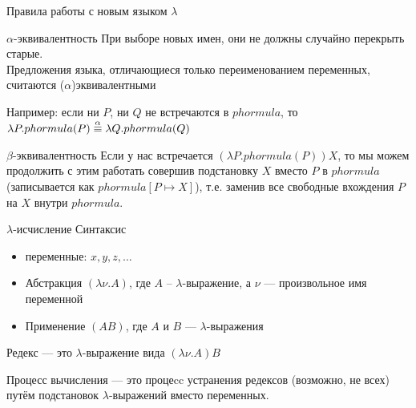 \begin{frame}{Правила работы с новым языком $\lambda$}
\begin{block}{$\alpha$-эквивалентность}
При выборе новых имен, они не должны случайно перекрыть старые.\\
Предложения языка, отличающиеся только переименованием переменных, считаются ($\alpha$)эквивалентными
\end{block}
Например:  если ни $P$, ни $Q$ не встречаются в $phormula$, то $\lambda P. phormula(P)  \overset{\alpha}{\equiv}{} \lambda Q. phormula(Q) $

\begin{block}{$\beta$-эквивалентность}
Если у нас встречается $(\lambda P. phormula(P))X$, то мы можем продолжить с этим работать совершив подстановку $X$ вместо $P$ в $phormula$ (записывается как $phormula[P\mapsto X]$), т.е. заменив все свободные вхождения $P$ на $X$ внутри $phormula$.
\end{block}
\end{frame}


\begin{frame}{$\lambda$-исчисление}
Синтаксис
\begin{itemize}
  \item переменные: $x,y,z,\dots$
  \item Абстракция $(\lambda \nu. A)$, где $A$ -- $\lambda$-выражение, а $\nu$ --- произвольное имя переменной
  \item Применение $(AB)$, где $A$ и $B$ --- $\lambda$-выражения
\end{itemize}
\begin{definition}{Редекс}
  --- это $\lambda$-выражение вида $(\lambda \nu. A)B$
\end{definition}
Процесс вычисления --- это процеcc устранения редексов (возможно, не всех) путём подстановок $\lambda$-выражений вместо переменных.
\end{frame}

